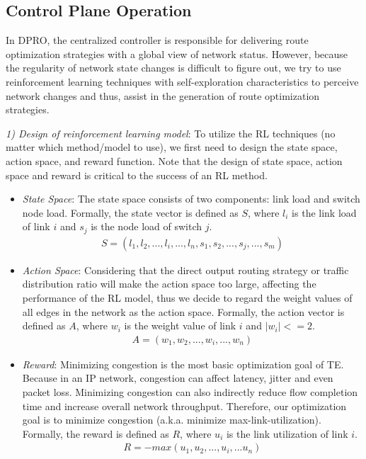\documentclass[10pt,conference]{IEEEtran}
\begin{document}
\subsection{Control Plane Operation}
In DPRO, the centralized controller is responsible for delivering route optimization strategies with a global view of network status. However, because the regularity of network state changes is difficult to figure out, we try to use reinforcement learning techniques with self-exploration characteristics to perceive network changes and thus, assist in the generation of route optimization strategies.

\emph{1) Design of reinforcement learning model}: To utilize the RL techniques (no matter which method/model to use), we first need to design the state space, action space, and reward function. Note that the design of state space, action space and reward is critical to the success of an RL method.
\begin{itemize}
\item\emph{State Space}: The state space consists of two components: link load and switch node load. Formally, the state vector is defined as $S$, where $l_i$ is the link load of link $i$ and $s_j$ is the node load of switch $j$.
\begin{equation*}
\begin{aligned}
S=(l_1, l_2,...,l_i,...,l_n,s_1,s_2,...,s_j,...,s_m)
\end{aligned}
\label{state}
\end{equation*}

\item\emph{Action Space}: Considering that the direct output routing strategy or traffic distribution ratio will make the action space too large, affecting the performance of the RL model, thus we decide to regard the weight values of all edges in the network as the action space. Formally, the action vector is defined as $A$, where $w_i$ is the weight value of link $i$ and $|w_i|<=2$.
\begin{equation*}
\begin{aligned}
A=(w_1,w_2,...,w_i,...,w_n)
\end{aligned}
\label{action}
\end{equation*}
\item\emph{Reward}: Minimizing congestion is the most basic optimization goal of TE. Because in an IP network, congestion can affect latency, jitter and even packet loss. Minimizing congestion can also indirectly reduce flow completion time and increase overall network throughput. Therefore, our optimization goal is to minimize congestion (a.k.a. minimize max-link-utilization). Formally, the reward is defined as $R$, where $u_i$ is the link utilization of link $i$.
\begin{equation*}
\begin{aligned}
R=-max(u_1,u_2,...,u_i,...u_n)
\end{aligned}
\label{reward}
\end{equation*}
\end{itemize}
\end{document}
